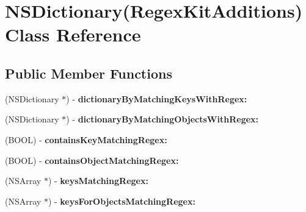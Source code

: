 \hypertarget{interface_n_s_dictionary_07_regex_kit_additions_08}{\section{N\-S\-Dictionary(Regex\-Kit\-Additions) Class Reference}
\label{interface_n_s_dictionary_07_regex_kit_additions_08}
}
\subsection*{Public Member Functions}
\begin{DoxyCompactItemize}
\item 
\hypertarget{interface_n_s_dictionary_07_regex_kit_additions_08_aeac2aa450651b76ebd183ed6e37bcb32}{(N\-S\-Dictionary $\ast$) -\/ {\bfseries dictionary\-By\-Matching\-Keys\-With\-Regex\-:}}\label{interface_n_s_dictionary_07_regex_kit_additions_08_aeac2aa450651b76ebd183ed6e37bcb32}

\item 
\hypertarget{interface_n_s_dictionary_07_regex_kit_additions_08_aba1641ff6e105b27c920dddf09515fd1}{(N\-S\-Dictionary $\ast$) -\/ {\bfseries dictionary\-By\-Matching\-Objects\-With\-Regex\-:}}\label{interface_n_s_dictionary_07_regex_kit_additions_08_aba1641ff6e105b27c920dddf09515fd1}

\item 
\hypertarget{interface_n_s_dictionary_07_regex_kit_additions_08_affebe799174dde6995d30f9ff3f01dee}{(B\-O\-O\-L) -\/ {\bfseries contains\-Key\-Matching\-Regex\-:}}\label{interface_n_s_dictionary_07_regex_kit_additions_08_affebe799174dde6995d30f9ff3f01dee}

\item 
\hypertarget{interface_n_s_dictionary_07_regex_kit_additions_08_a98f34268790196f820e428a7acb2d062}{(B\-O\-O\-L) -\/ {\bfseries contains\-Object\-Matching\-Regex\-:}}\label{interface_n_s_dictionary_07_regex_kit_additions_08_a98f34268790196f820e428a7acb2d062}

\item 
\hypertarget{interface_n_s_dictionary_07_regex_kit_additions_08_a49335862d9824a69981b036a5d2eb0d8}{(N\-S\-Array $\ast$) -\/ {\bfseries keys\-Matching\-Regex\-:}}\label{interface_n_s_dictionary_07_regex_kit_additions_08_a49335862d9824a69981b036a5d2eb0d8}

\item 
\hypertarget{interface_n_s_dictionary_07_regex_kit_additions_08_a81036aeb29611e6ad3eda99dfbe677f0}{(N\-S\-Array $\ast$) -\/ {\bfseries keys\-For\-Objects\-Matching\-Regex\-:}}\label{interface_n_s_dictionary_07_regex_kit_additions_08_a81036aeb29611e6ad3eda99dfbe677f0}


\end{DoxyCompactItemize}
